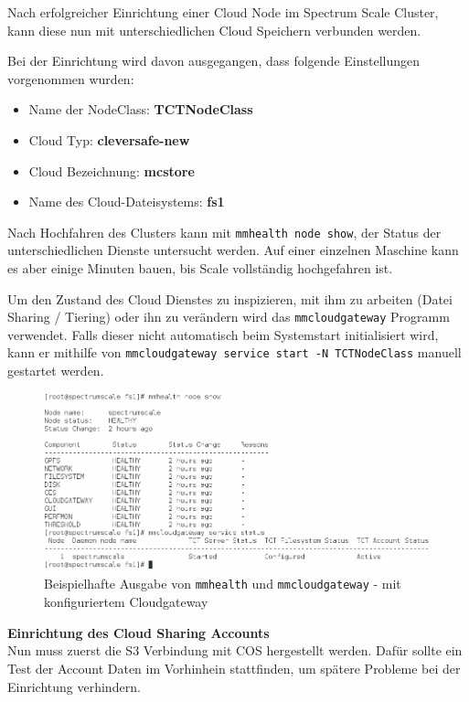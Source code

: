 Nach erfolgreicher Einrichtung einer Cloud Node im Spectrum Scale Cluster, kann diese nun mit unterschiedlichen Cloud Speichern verbunden werden.

Bei der Einrichtung wird davon ausgegangen, dass folgende Einstellungen vorgenommen wurden:
\begin{itemize}
	\item Name der NodeClass: \textbf{TCTNodeClass}
	\item Cloud Typ: \textbf{cleversafe-new}
	\item Cloud Bezeichnung: \textbf{mcstore}
	\item Name des Cloud-Dateisystems: \textbf{fs1}
\end{itemize}

Nach Hochfahren des Clusters kann mit \lstinline|mmhealth node show|, der Status der unterschiedlichen Dienste untersucht werden. Auf einer einzelnen Maschine kann es aber einige Minuten bauen, bis Scale vollständig hochgefahren ist.

Um den Zustand des Cloud Dienstes zu inspizieren, mit ihm zu arbeiten (Datei Sharing / Tiering) oder ihn zu verändern wird das \lstinline|mmcloudgateway| Programm verwendet. Falls dieser nicht automatisch beim Systemstart initialisiert wird, kann er mithilfe von \lstinline|mmcloudgateway service start -N TCTNodeClass| manuell gestartet werden.

\begin{figure}[hbt]
	\centering
	\includegraphics[scale=0.5]{images/scale-status}
	\caption{Beispielhafte Ausgabe von \lstinline|mmhealth| und \lstinline|mmcloudgateway| - mit konfiguriertem Cloudgateway}
	\label{fig:saclestatus}
\end{figure}


\textbf{Einrichtung des Cloud Sharing Accounts}\\
Nun muss zuerst die S3 Verbindung mit \ac{COS} hergestellt werden. Dafür sollte ein Test der Account Daten im Vorhinhein stattfinden, um spätere Probleme bei der Einrichtung verhindern.

